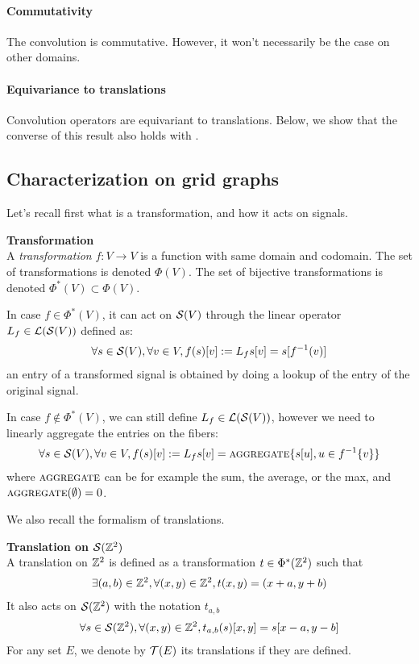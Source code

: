\paragraph{Commutativity}
The convolution is commutative. However, it won't necessarily be the case on other domains.

\paragraph{Equivariance to translations}
Convolution operators are equivariant to translations. Below, we show that the converse of this result also holds with .

\subsection{Characterization on grid graphs}

Let's recall first what is a transformation, and how it acts on signals.

\begin{definition}\textbf{Transformation}\\
A \emph{transformation} $f: V \rightarrow V$ is a function with same domain and codomain. The set of transformations is denoted $\Phi(V)$. The set of bijective transformations is denoted $\Phi^*(V) \subset \Phi(V)$.

In case $f \in \Phi^*(V)$, it can act on $\mathcal{S}(V)$ through the linear operator $L_f \in \mathcal{L}(\mathcal{S}(V))$ defined as:
\begin{gather*}
\forall s \in \mathcal{S}(V), \forall v \in V, f(s)[v] := L_f s[v] = s[f^{-1}(v)]
\end{gather*}
\ie an entry of a transformed signal is obtained by doing a lookup of the entry of the original signal.

In case $f \notin \Phi^*(V)$, we can still define $L_f \in \mathcal{L}(\mathcal{S}(V))$, however we need to linearly aggregate the entries on the fibers:
\begin{gather*}
\forall s \in \mathcal{S}(V), \forall v \in V, f(s)[v] := L_f s[v] = \operatorname{\textsc{aggregate}}\{s[u], u \in f^{-1}\{v\}\}
\end{gather*}
where $\operatorname{\textsc{aggregate}}$ can be for example the sum, the average, or the max, and $\operatorname{\textsc{aggregate}}(\emptyset) = 0$.
\end{definition}

We also recall the formalism of translations.

\begin{definition}\textbf{Translation on $\mathcal{S}(\mathbb{Z}^2)$}\\
A translation on $\mathbb{Z}^2$ is defined as a transformation $t \in \Phi^*(\mathbb{Z}^2)$ such that
\begin{gather*}
\exists (a,b) \in \mathbb{Z}^2, \forall (x,y) \in \mathbb{Z}^2, t(x,y) = (x+a,y+b)
\end{gather*}
It also acts on $\mathcal{S}(\mathbb{Z}^2)$ with the notation $t_{a,b}$ \ie
\begin{gather*}
\forall s \in \mathcal{S}(\mathbb{Z}^2), \forall (x,y) \in \mathbb{Z}^2, t_{a,b}(s)[x,y] = s[x-a, y-b]
\end{gather*}
For any set $E$, we denote by $\mathcal{T}(E)$ its translations if they are defined.
\end{definition}

